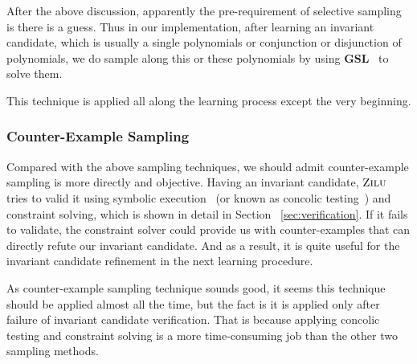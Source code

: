 After the above discussion, apparently the pre-requirement of selective sampling is there is a guess.
Thus in our implementation, after learning an invariant candidate, 
which is usually a single polynomials or conjunction or disjunction of polynomials,
we do sample along this or these polynomials by using \textbf{GSL}~\cite{gough2009gnu} to solve them.

This technique is applied all along the learning process except the very beginning.



\subsubsection{Counter-Example Sampling}
Compared with the above sampling techniques, we should admit counter-example sampling is more directly and objective.  
Having an invariant candidate, $\textsc{Zilu}$ tries to valid it using symbolic execution~\cite{king1976symbolic}\cite{khurshid2003generalized}
(or known as concolic testing~\cite{sen2007concolic}) and constraint solving,
which is shown in detail in Section ~\ref{sec:verification}.
If it fails to validate, the constraint solver could provide us with counter-examples that can directly refute our invariant candidate.
And as a result, it is quite useful for the invariant candidate refinement in the next learning procedure.

As counter-example sampling technique sounds good, it seems this technique should be applied almost all the time, 
but the fact is it is applied only after failure of invariant candidate verification.
That is because applying concolic testing and constraint solving is a more time-consuming job than the other two sampling methods.

